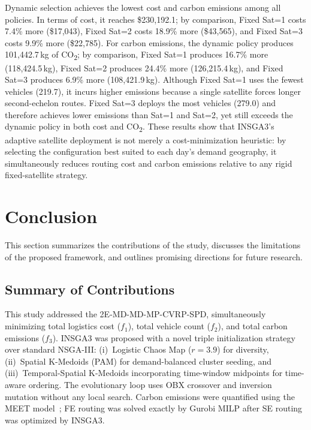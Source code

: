 \documentclass[11pt, a4paper]{article}
\numberwithin{equation}{section}
\begin{document}
Dynamic selection achieves the lowest cost and carbon emissions among all
policies.  In terms of cost, it reaches \$230{,}192.1; by comparison, Fixed Sat=1
costs 7.4\% more (\$17{,}043), Fixed Sat=2 costs 18.9\% more (\$43{,}565),
and Fixed Sat=3 costs 9.9\% more (\$22{,}785).  For carbon emissions, the
dynamic policy produces 101{,}442.7\,kg of CO\textsubscript{2}; by comparison,
Fixed Sat=1 produces 16.7\% more (118{,}424.5\,kg), Fixed Sat=2 produces
24.4\% more (126{,}215.4\,kg), and Fixed Sat=3 produces 6.9\% more
(108{,}421.9\,kg).  Although Fixed Sat=1 uses the fewest vehicles (219.7), it incurs higher
emissions because a single satellite forces longer second-echelon routes.
Fixed Sat=3 deploys the most vehicles (279.0) and therefore achieves lower
emissions than Sat=1 and Sat=2, yet still exceeds the dynamic policy in both
cost and CO\textsubscript{2}.  These results show that INSGA3's adaptive satellite
deployment is not merely a cost-minimization heuristic: by selecting the
configuration best suited to each day's demand geography, it simultaneously
reduces routing cost and carbon emissions relative to any rigid
fixed-satellite strategy.

\section{Conclusion}
\label{sec:conc}

This section summarizes the contributions of the study, discusses the
limitations of the proposed framework, and outlines promising directions for
future research.

\subsection{Summary of Contributions}

This study addressed the 2E-MD-MD-MP-CVRP-SPD, simultaneously minimizing
total logistics cost ($f_1$), total vehicle count ($f_2$), and total
carbon emissions ($f_3$).  INSGA3 was proposed with a novel triple
initialization strategy over standard NSGA-III: (i)~Logistic Chaos Map
($r=3.9$) for diversity, (ii)~Spatial K-Medoids (PAM) for demand-balanced
cluster seeding, and (iii)~Temporal-Spatial K-Medoids incorporating
time-window midpoints for time-aware ordering.  The evolutionary loop uses
OBX crossover and inversion mutation without any local search.  Carbon
emissions were quantified using the MEET model~\cite{hickman1999}; FE routing
was solved exactly by Gurobi MILP after SE routing was optimized by INSGA3.
\end{document}
